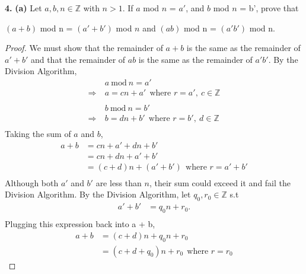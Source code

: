 \documentclass[12pt, letterpaper]{article}
\begin{document}
\noindent \textbf{4.}
\textbf{(a)} Let $a,b,n \in \mathbb{Z}$ with $n > 1$. If $a$ mod $n$ = $a'$, and $b$ mod $n$ = b', prove that 
\begin{center}
    $(a+b)$ mod n = $(a' + b')$ mod $n$ and $(ab)$ mod n = $(a'b')$ mod n.
\end{center}
\begin{proof}
    We must show that the remainder of $a + b$ is the same as the remainder of $a' + b'$ and that the remainder of $ab$ is the same as the remainder of $a'b'$. By the Division Algorithm,
    \begin{align*}
        &a \ \text{mod} \ n = a' \\
        \Rightarrow \ &a = cn + a' \ \ \text{where $r = a', \ c\in \mathbb{Z}$} \\
        \\ 
        &b \ \text{mod} \ n = b' \\
        \Rightarrow \ &b = dn + b' \ \ \text{where $r = b', \ d \in \mathbb{Z}$} \\
    \end{align*}
    Taking the sum of $a$ and $b$,
    \begin{align*}
        a + b &= cn + a' + dn + b' \\
        &= cn + dn + a' + b'\\
        &= (c + d)n + (a' + b') \ \ \text{where $r = a' + b'$}\\
    \end{align*}
    Although both $a'$ and $b'$ are less than $n$, their sum could exceed it and fail the Division Algorithm. By the Division Algorithm, let $q_{0}, r_{0} \in \mathbb{Z}$ s.t 
    \begin{align*}
        a' + b' &= q_{0}n + r_{0}. \\
    \end{align*}
    Plugging this expression back into a + b, 
    \begin{align*}
        a + b &= (c + d)n + q_{0}n + r_{0} \\
        &= (c + d + q_{0})n + r_{0} \ \ \text{where $r = r_{0}$}
    \end{align*}
    

\end{proof}
\end{document}
